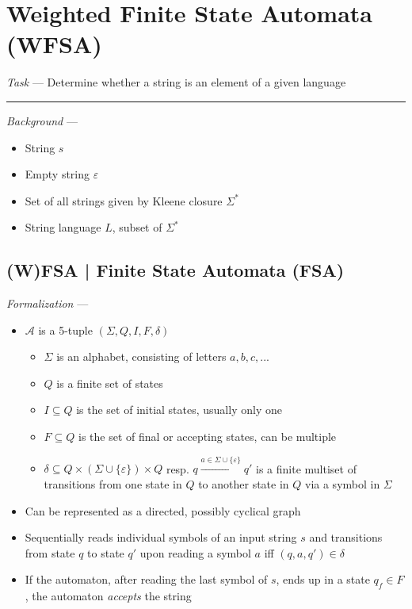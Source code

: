\section{Weighted Finite State Automata (WFSA)}
\emph{Task} --- Determine whether a string is an element of a given language

{\color{lightgray}\hrule height 0.001mm}

\emph{Background} ---
\begin{itemize}
    \item String $s$
    \item Empty string $\varepsilon$
    \item Set of all strings given by Kleene closure $\Sigma^*$
    \item String language $L$, subset of $\Sigma^*$ 
\end{itemize}

\subsection*{(W)FSA | Finite State Automata (FSA)}
\emph{Formalization} --- 
\begin{itemize}
    \item $\mathcal{A}$ is a 5-tuple $(\Sigma, Q, I, F, \delta)$
    \begin{itemize}
        \item $\Sigma$ is an alphabet, consisting of letters $a,b,c,...$
        \item $Q$ is a finite set of states
        \item $I \subseteq Q$ is the set of initial states, usually only one
        \item $F \subseteq Q$ is the set of final or accepting states, can be multiple
        \item $\delta \subseteq Q \times (\Sigma \cup \{\varepsilon\}) \times Q$ resp. $q \xrightarrow{a \in \Sigma \cup \{\varepsilon\}} q'$ is a finite multiset of transitions from one state in $Q$ to another state in $Q$ via a symbol in $\Sigma$ 
    \end{itemize}
    \item Can be represented as a directed, possibly cyclical graph
    \item Sequentially reads individual symbols of an input string $s$ and transitions from state $q$ to state $q'$ upon reading a symbol $a$ iff $(q, a, q') \in \delta$
    \item If the automaton, after reading the last symbol of $s$, ends up in a state $q_f \in F$, the automaton \emph{accepts} the string
\end{itemize}

